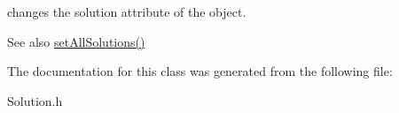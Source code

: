 changes the solution attribute of the object. \begin{DoxySeeAlso}{See also}
\hyperlink{class_solution_a820fbf0f27410781d4f9ed8151d65c67}{set\+All\+Solutions()} 
\end{DoxySeeAlso}


The documentation for this class was generated from the following file\+:\begin{DoxyCompactItemize}
\item 
Solution.\+h\end{DoxyCompactItemize}
